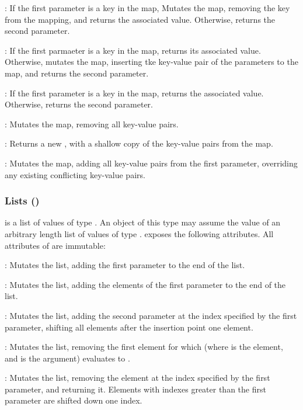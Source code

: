 : If the first parameter is a key in the map, Mutates the
map, removing the key from the mapping, and returns the associated value.
Otherwise, returns the second parameter.

: If the first parmaeter is a key in the map, returns
its associated value. Otherwise, mutates the map, inserting tke key-value pair
of the parameters to the map, and returns the second parameter.

: If the first parameter is a key in the map, returns the
associated value. Otherwise, returns the second parameter.

: Mutates the map, removing all key-value pairs.

: Returns a new , with a shallow copy
of the key-value pairs from the map.

: Mutates the map, adding all key-value pairs from
the first parameter, overriding any existing conflicting key-value pairs.

\subsubsection{Lists (\code{[T]})}

\code{[T]} is a list of values of type . An object of this type may
assume the value of an arbitrary length list of values of type .
\code{[T]} exposes the following attributes. All attributes of \code{[T]} are
immutable:

: Mutates the list, adding the first parameter to the end
of the list.

: Mutates the list, adding the elements of the first
parameter to the end of the list.

: Mutates the list, adding the second parameter
at the index specified by the first parameter, shifting all elements after
the insertion point one element.

: Mutates the list, removing the first element for which
 (where  is the element, and  is the
argument) evaluates to .

: Mutates the list, removing the element at the index
specified by the first parameter, and returning it. Elements with indexes
greater than the first parameter are shifted down one index.

